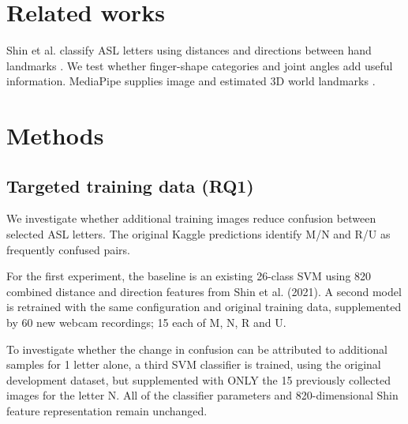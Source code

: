 \section{Related works}

Shin et al. classify ASL letters using distances and directions between hand landmarks \citep{ton-shin2021}. We test whether finger-shape categories and joint angles add useful information. MediaPipe supplies image and estimated 3D world landmarks \citep{ton-mediapipedocs}.

\section{Methods}

\subsection{Targeted training data (RQ1)}
We investigate whether additional training images reduce confusion between selected ASL letters. The original Kaggle predictions identify M/N and R/U as frequently confused pairs.

For the first experiment, the baseline is an existing 26-class SVM using 820 combined distance and direction features from Shin et al. (2021). A second model is retrained with the same configuration and original training data, supplemented by 60 new webcam recordings; 15 each of M, N, R and U.

To investigate whether the change in confusion can be attributed to additional samples for 1 letter alone, a third SVM classifier is trained, using the original development dataset, but supplemented with ONLY the 15 previously collected images for the letter N. All of the classifier parameters and 820-dimensional Shin feature representation remain unchanged. 

